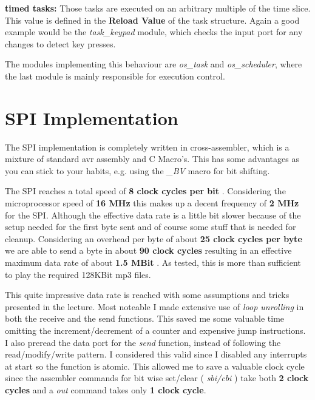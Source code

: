 \documentclass[12pt,a4paper,titlepage,oneside]{article}
\begin{document}
{\bf timed tasks:} Those tasks are executed on an arbitrary multiple of the time slice. This value is defined in the {\bf Reload Value} of the task structure. Again a good example would be the {\it task\_keypad} module, which checks the input port for any changes to detect key presses.

The modules implementing this behaviour are {\it os\_task} and  {\it os\_scheduler}, where the last module is mainly responsible for execution control.

\section{SPI Implementation}

The SPI implementation is completely written in cross-assembler, which is a mixture of standard avr assembly and C Macro's. This has some advantages as you can stick to your habits, e.g. using the { \it \_BV } macro for bit shifting.

The SPI reaches a total speed of { \bf 8 clock cycles per bit }. Considering the microprocessor speed of { \bf 16 MHz } this makes up a decent frequency of { \bf 2 MHz } for the SPI. Although the effective data rate is a little bit slower because of the setup needed for the first byte sent and of course some stuff that is needed for cleanup. Considering an overhead per byte of about { \bf 25 clock cycles per byte } we are able to send a byte in about { \bf 90 clock cycles } resulting in an effective maximum data rate of about { \bf 1.5 MBit }.  As tested, this is more than sufficient to play the required 128KBit mp3 files.

This quite impressive data rate is reached with some assumptions and tricks presented in the lecture. Most noteable I made extensive use of { \it loop unrolling } in both the receive and the send functions. This saved me some valuable time omitting the increment/decrement of a counter and expensive jump instructions. I also preread the data port for the {\it send } function, instead of following the read/modify/write pattern. I considered this valid since I disabled any interrupts at start so the function is atomic. This allowed me to save a valuable clock cycle since the assembler commands for bit wise set/clear ({ \it sbi/cbi }) take both { \bf 2 clock cycles} and a { \it out } command takes only { \bf 1 clock cycle}. 
\end{document}
